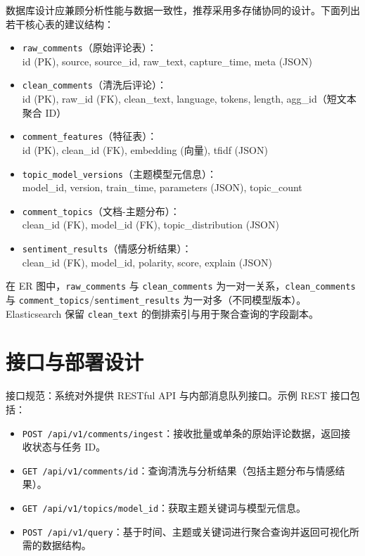 数据库设计应兼顾分析性能与数据一致性，推荐采用多存储协同的设计。下面列出若干核心表的建议结构：

\begin{itemize}
	\item \texttt{raw\_comments}（原始评论表）：\\
		id (PK), source, source\_id, raw\_text, capture\_time, meta (JSON)
	\item \texttt{clean\_comments}（清洗后评论）：\\
		id (PK), raw\_id (FK), clean\_text, language, tokens, length, agg\_id（短文本聚合 ID）
	\item \texttt{comment\_features}（特征表）：\\
		id (PK), clean\_id (FK), embedding (向量), tfidf (JSON)
	\item \texttt{topic\_model\_versions}（主题模型元信息）：\\
		model\_id, version, train\_time, parameters (JSON), topic\_count
	\item \texttt{comment\_topics}（文档-主题分布）：\\
		clean\_id (FK), model\_id (FK), topic\_distribution (JSON)
	\item \texttt{sentiment\_results}（情感分析结果）：\\
		clean\_id (FK), model\_id, polarity, score, explain (JSON)
\end{itemize}

在 ER 图中，\texttt{raw\_comments} 与 \texttt{clean\_comments} 为一对一关系，\texttt{clean\_comments} 与 \texttt{comment\_topics}/\texttt{sentiment\_results} 为一对多（不同模型版本）。Elasticsearch 保留 \texttt{clean\_text} 的倒排索引与用于聚合查询的字段副本。

\section{接口与部署设计}
\label{sec:api_deploy}

接口规范：系统对外提供 RESTful API 与内部消息队列接口。示例 REST 接口包括：

\begin{itemize}
\item \texttt{POST /api/v1/comments/ingest}：接收批量或单条的原始评论数据，返回接收状态与任务 ID。
\item \texttt{GET /api/v1/comments/{id}}：查询清洗与分析结果（包括主题分布与情感结果）。
\item \texttt{GET /api/v1/topics/{model\_id}}：获取主题关键词与模型元信息。
\item \texttt{POST /api/v1/query}：基于时间、主题或关键词进行聚合查询并返回可视化所需的数据结构。
\end{itemize}

